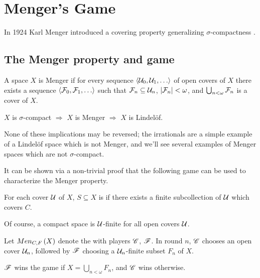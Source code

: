 
\chapter{Menger's Game}

In 1924 Karl Menger introduced a covering property generalizing
$\sigma$-compactness \cite{custom31879423}.

\section{The Menger property and game}

\begin{defn}
  A space $X$ is Menger if for every sequence $\<\mc U_0,\mc U_1,\dots\>$
  of open covers of $X$ there exists a sequence
  $\<\mc F_0,\mc F_1,\dots\>$ such that $\mathcal{F}_n\subseteq \mathcal{U}_n$,
  $|\mathcal{F}_n|<\omega$, and $\bigcup_{n<\omega}\mathcal{F}_n$ is a cover of $X$.
\end{defn}

\begin{prop}
  $X$ is $\sigma$-compact
    $\Rightarrow$
  $X$ is Menger
    $\Rightarrow$
  $X$ is Lindel\"of.
\end{prop}

None of these implications may be reversed; the irrationals are a simple example
of a Lindel\"of space which is not Menger, and we'll see several examples of
Menger spaces which are not $\sigma$-compact.

It can be shown via a non-trivial
proof that the following game can be used to characterize the Menger property.

\begin{defn}
  For each cover $\mathcal{U}$ of $X$, $S\subseteq X$ is  if
  there exists a finite subcollection of $\mathcal{U}$ which covers $C$.
\end{defn}

Of course, a compact space is $\mathcal{U}$-finite for all open covers $\mathcal{U}$.

\begin{game}
  Let $Men_{C,F}\left({X}\right)$ denote the  with players $\mathscr{C}$, $\mathscr{F}$.
  In round $n$, $\mathscr{C}$ chooses an open cover $\mathcal{U}_n$, followed by $\mathscr{F}$
  choosing a $\mathcal{U}_n$-finite subset $F_n$ of $X$.

  $\mathscr{F}$ wins the game if $X = \bigcup_{n<\omega}F_n$,
  and $\mathscr{C}$ wins otherwise.
\end{game}

